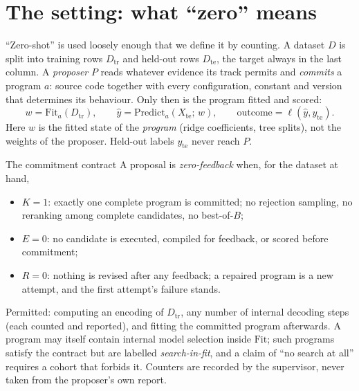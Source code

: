 \section{The setting: what ``zero'' means}
\label{sec:setting}

``Zero-shot'' is used loosely enough that we define it by counting. A dataset $D$ is split into
training rows $D_{\mathrm{tr}}$ and held-out rows $D_{\mathrm{te}}$, the target always in the last
column. A \emph{proposer} $P$ reads whatever evidence its track permits and \emph{commits} a program
$a$: source code together with every configuration, constant and version that determines its
behaviour. Only then is the program fitted and scored:
\begin{equation}
w = \mathrm{Fit}_a(D_{\mathrm{tr}}), \qquad \hat y = \mathrm{Predict}_a(X_{\mathrm{te}};\, w),
\qquad \text{outcome} = \ell(\hat y, y_{\mathrm{te}}).
\label{eq:commit}
\end{equation}
Here $w$ is the fitted state of the \emph{program} (ridge coefficients, tree splits), not the
weights of the proposer. Held-out labels $y_{\mathrm{te}}$ never reach $P$.

\begin{definition}{The commitment contract}
\label{def:zero}
A proposal is \emph{zero-feedback} when, for the dataset at hand,
\begin{itemize}
\item $K=1$: exactly one complete program is committed; no rejection sampling, no reranking among
complete candidates, no best-of-$B$;
\item $E=0$: no candidate is executed, compiled for feedback, or scored before commitment;
\item $R=0$: nothing is revised after any feedback; a repaired program is a new attempt, and the
first attempt's failure stands.
\end{itemize}
Permitted: computing an encoding of $D_{\mathrm{tr}}$, any number of internal decoding steps
(each counted and reported), and fitting the committed program afterwards. A program may itself
contain internal model selection inside $\mathrm{Fit}$; such programs satisfy the contract but are
labelled \emph{search-in-fit}, and a claim of ``no search at all'' requires a cohort that forbids
it. Counters are recorded by the supervisor, never taken from the proposer's own report.
\end{definition}

